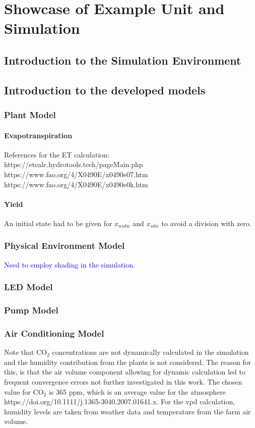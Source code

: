 \chapter{Showcase of Example Unit and Simulation}
\label{chap:simulation}
%
\section{Introduction to the Simulation Environment}

\section{Introduction to the developed models}

\subsection{Plant Model}
\subsubsection{Evapotranspiration}
References for the ET calculation:\\
https://etcalc.hydrotools.tech/pageMain.php\\
https://www.fao.org/4/X0490E/x0490e07.htm\\
https://www.fao.org/4/X0490E/x0490e0k.htm\\

\subsubsection{Yield}
\label{subsub:yield-model}
An initial state had to be given for $x_{nsdw}$ and $x_{sdw}$ to avoid a division with zero.

\subsection{Physical Environment Model}
\textcolor{Blue}{Need to employ shading in the simulation.}

\subsection{LED Model}
\subsection{Pump Model}
\subsection{Air Conditioning Model}
Note that $\text{CO}_2$ concentrations are not dynamically calculated in the simulation and the humidity contribution from the plants is not considered.
The reason for this, is that the air volume component allowing for dynamic calculation led to frequent convergence errors not further investigated in this work.
The chosen value for $\text{CO}_2$ is 365 ppm, which is an average value for the atmosphere https://doi.org/10.1111/j.1365-3040.2007.01641.x.
For the \ac{vpd} calculation, humidity levels are taken from weather data and temperature from the farm air volume.



